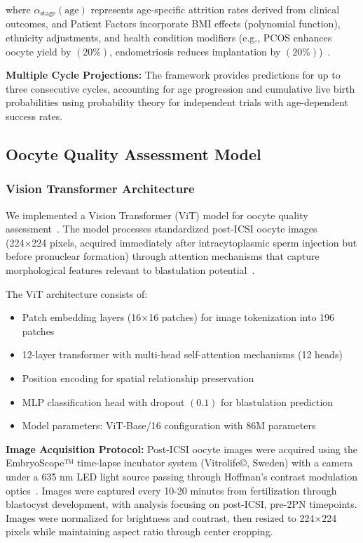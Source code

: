 where $\alpha_{\text{stage}}(\text{age})$ represents age-specific attrition rates derived from clinical outcomes, and Patient Factors incorporate BMI effects (polynomial function), ethnicity adjustments, and health condition modifiers (e.g., PCOS enhances oocyte yield by $(20\%)$, endometriosis reduces implantation by $(20\%)$)~\cite{lee2017amh}.

\textbf{Multiple Cycle Projections:}
The framework provides predictions for up to three consecutive cycles, accounting for age progression and cumulative live birth probabilities using probability theory for independent trials with age-dependent success rates.

\subsection{Oocyte Quality Assessment Model}\label{subsec:quality}

\subsubsection{Vision Transformer Architecture}

We implemented a Vision Transformer (ViT) model for oocyte quality assessment~\cite{dosovitskiy2021image,alhammuri2023vision}. The model processes standardized post-ICSI oocyte images (224×224 pixels, acquired immediately after intracytoplasmic sperm injection but before pronuclear formation) through attention mechanisms that capture morphological features relevant to blastulation potential~\cite{zhang2021machine}.

The ViT architecture consists of:
\begin{itemize}
\item Patch embedding layers (16×16 patches) for image tokenization into 196 patches
\item 12-layer transformer with multi-head self-attention mechanisms (12 heads)
\item Position encoding for spatial relationship preservation
\item MLP classification head with dropout $(0.1)$ for blastulation prediction
\item Model parameters: ViT-Base/16 configuration with 86M parameters
\end{itemize}

\textbf{Image Acquisition Protocol:} Post-ICSI oocyte images were acquired using the EmbryoScope™ time-lapse incubator system (Vitrolife©, Sweden) with a camera under a 635 nm LED light source passing through Hoffman's contrast modulation optics~\cite{gomez2022timelapse}. Images were captured every 10-20 minutes from fertilization through blastocyst development, with analysis focusing on post-ICSI, pre-2PN timepoints. Images were normalized for brightness and contrast, then resized to 224×224 pixels while maintaining aspect ratio through center cropping.

